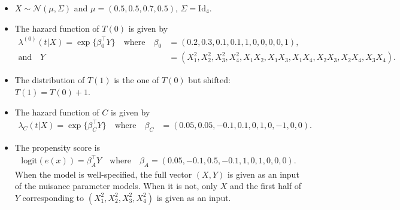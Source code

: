 \documentclass[
  11pt,
  a4paper,
]{article}
\theoremstyle{plain}
\theoremstyle{plain}
\theoremstyle{plain}
\theoremstyle{definition}
\theoremstyle{remark}
\begin{document}
\begin{itemize}
\item
  \(X \sim \mathcal{N}\left(\mu, \Sigma\right)\) and
  \(\mu = (0.5,0.5,0.7,0.5)\), \(\Sigma = \mathrm{Id}_4\).
\item
  The hazard function of \(T(0)\) is given by \[
  \begin{aligned}
  \lambda^{(0)}(t|X) = \exp\{\beta_0^\top Y\} \quad \text{where} \quad \beta_0 &= (0.2,0.3,0.1,0.1,1,0,0,0,0,1), \\
  \text{and} \quad Y &= (X_1^2,X_2^2,X_3^2,X_4^2,X_1 X_2,X_1X_3,X_1X_4,X_2 X_3,X_2X_4, X_3 X_4).
  \end{aligned}
  \]
\item
  The distribution of \(T(1)\) is the one of \(T(0)\) but shifted:
  \(T(1) = T(0)+1\).
\item
  The hazard function of \(C\) is given by \[
  \begin{aligned}
  \lambda_C(t|X) = \exp\{\beta_C^\top Y\} \quad \text{where} \quad \beta_C &= (0.05,0.05,-0.1,0.1,0,1,0,-1,0,0).
  \end{aligned}
  \]
\item
  The propensity score is \[
  \begin{aligned}
  \mathrm{logit}(e(x)) = \beta_A^\top Y \quad \text{where} \quad \beta_A= (0.05,-0.1,0.5,-0.1,1,0,1,0,0,0).
  \end{aligned}
  \] When the model is well-specified, the full vector \((X,Y)\) is
  given as an input of the nuisance parameter models. When it is not,
  only \(X\) and the first half of \(Y\) corresponding to
  \((X_1^2,X_2^2,X_3^2,X_4^2)\) is given as an input.
\end{itemize}
\end{document}
